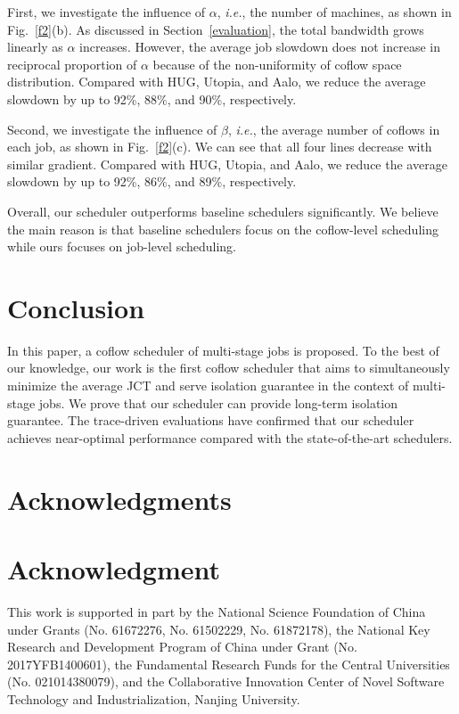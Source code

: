 \documentclass[10pt,journal,compsoc]{IEEEtran}
\begin{document}
First, we investigate the influence of $\alpha$, \emph{i.e.}, the number of machines, as shown in Fig.~\ref{f2}(b).
%
As discussed in Section~\ref{evaluation}, the total bandwidth grows linearly as $\alpha$ increases.
%
However, the average job slowdown does not increase in reciprocal proportion of $\alpha$ because of the non-uniformity of coflow space distribution.
%
Compared with HUG, Utopia, and Aalo, we reduce the average slowdown by up to 92\%, 88\%, and 90\%, respectively.

Second, we investigate the influence of $\beta$, \emph{i.e.}, the average number of coflows in each job, as shown in Fig.~\ref{f2}(c).
%
We can see that all four lines decrease with similar gradient.
%
Compared with HUG, Utopia, and Aalo, we reduce the average slowdown by up to 92\%, 86\%, and 89\%, respectively.

Overall, our scheduler outperforms baseline schedulers significantly.
%
We believe the main reason is that baseline schedulers focus on the coflow-level scheduling while ours focuses on job-level scheduling.

\section{Conclusion}
In this paper, a coflow scheduler of multi-stage jobs is proposed.
%
To the best of our knowledge, our work is the first coflow scheduler that aims to simultaneously minimize the average JCT and serve isolation guarantee in the context of multi-stage jobs.
%
We prove that our scheduler can provide long-term isolation guarantee.
%
The trace-driven evaluations have confirmed that our scheduler achieves near-optimal performance compared with the state-of-the-art schedulers.

\ifCLASSOPTIONcompsoc
  \section*{Acknowledgments}
\else
  \section*{Acknowledgment}
\fi
This work is supported in part by the National Science Foundation of China under Grants (No. 61672276, No. 61502229, No. 61872178), the National Key Research and Development Program of China under Grant (No. 2017YFB1400601), the Fundamental Research Funds for the Central Universities (No. 021014380079), and the Collaborative Innovation Center of Novel Software Technology and Industrialization, Nanjing University.
\end{document}
